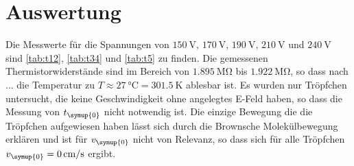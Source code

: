 \section{Auswertung}
\label{sec:Auswertung}  

Die Messwerte für die Spannungen von $\SI{150}{\volt}$, $\SI{170}{\volt}$, $\SI{190}{\volt}$, $\SI{210}{\volt}$
und $\SI{240}{\volt}$ sind \autoref{tab:t12}, \autoref{tab:t34} und \autoref{tab:t5} zu finden. Die gemessenen  
Thermistorwiderstände sind im Bereich von $\SI{1,895}{\mega\ohm}$ bis $\SI{1,922}{\mega\ohm}$, so dass nach ... die
Temperatur zu $T\approx \SI{27}{\celsius} = \SI{301,5}{\kelvin}$ ablesbar ist. Es wurden nur Tröpfchen untersucht,
die keine Geschwindigkeit ohne angelegtes E-Feld haben, so dass die Messung von $t_{\symup{0}}$ nicht notwendig
ist. Die einzige Bewegung die die Tröpfchen aufgewiesen haben lässt sich durch die Brownsche Molekülbewegung
erklären und ist für $v_{\symup{0}}$ nicht von Relevanz, so dass sich für alle Tröpfchen
$v_{\symup{0}} = \SI{0}{\centi\meter\per\second}$ ergibt.
